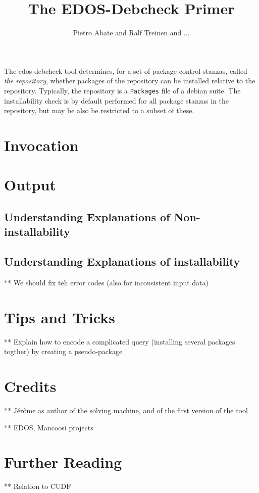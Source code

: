 \documentclass{article}
\title{The EDOS-Debcheck Primer}
\author{Pietro Abate and Ralf Treinen and ...}
\newcommand{\debcheck}{edos-debcheck}
\begin{document}
\maketitle

The \debcheck{} tool determines, for a set of package control stanzas,
called \emph{the repository}, whether packages of the repository can
be installed relative to the repository. Typically, the repository is
a \texttt{Packages} file of a debian suite. The installability check
is by default performed for all package stanzas in the repository, but
may be also be restricted to a subset of these.

\tableofcontents




\section{Invocation}
\label{sec:invocation}

\section{Output}
\label{sec:output}

\subsection{Understanding Explanations of Non-installability}

\subsection{Understanding Explanations of installability} 

** We should fix teh error codes (also for inconsistent input data)

\section{Tips and Tricks}
\label{sec:tricks}
** Explain how to encode a complicated query (installing several
packages togther) by creating a pseudo-package

\section{Credits}
\label{sec:credits}

** Jérôme as author of the solving machine, and of the first version
of the tool

** EDOS, Mancoosi projects 

\section{Further Reading}
** Relation to CUDF
 
\end{document}
